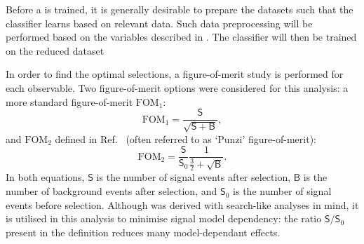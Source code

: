 Before a \BDT is trained, it is generally desirable to prepare the datasets such that the classifier 
learns based on relevant data.
Such data preprocessing will be performed based on the variables described in .
The classifier will then be trained on the reduced dataset

In order to find the optimal selections, a figure-of-merit study is performed for each observable.
Two figure-of-merit options were considered for this analysis: a more standard figure-of-merit $\mathrm{FOM}_1$:
\begin{equation}\label{eq:soversqrtsplusb}
    \mathrm{FOM}_1 = \frac{\mathsf{S}}{\sqrt{\mathsf{S}+\mathsf{B}}},
\end{equation}
and $\mathrm{FOM}_2$ defined in Ref.~\cite{Punzi:2003bu} (often referred to as `Punzi' figure-of-merit):
\begin{equation}\label{eq:punzi_fom}
    \mathrm{FOM}_2 = \frac{\mathsf{S}}{\mathsf{S}_0} \frac{1}{\frac{3}{2}+\sqrt{\mathsf{B}}}.
\end{equation}
In both equations, $\mathsf{S}$ is the number of signal events after selection, 
$\mathsf{B}$ is the number of background events after selection, 
and $\mathsf{S}_0$ is the number of signal events before selection.
Although  was derived with search-like analyses in mind, 
it is utilised in this analysis to minimise signal model dependency: the ratio $\mathsf{S}/\mathsf{S}_0$ present in the definition reduces many model-dependant effects.

